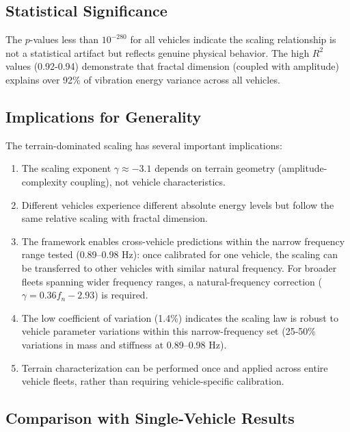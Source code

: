 \documentclass[11pt]{article}
\begin{document}
\subsection{Statistical Significance}

The $p$-values less than $10^{-280}$ for all vehicles indicate the scaling relationship is not a statistical artifact but reflects genuine physical behavior. The high $R^2$ values (0.92-0.94) demonstrate that fractal dimension (coupled with amplitude) explains over 92\% of vibration energy variance across all vehicles.

\subsection{Implications for Generality}

The terrain-dominated scaling has several important implications:

\begin{enumerate}
\item The scaling exponent $\gamma \approx -3.1$ depends on terrain geometry (amplitude-complexity coupling), not vehicle characteristics.

\item Different vehicles experience different absolute energy levels but follow the same relative scaling with fractal dimension.

\item The framework enables cross-vehicle predictions within the narrow frequency range tested (0.89--0.98 Hz): once calibrated for one vehicle, the scaling can be transferred to other vehicles with similar natural frequency. For broader fleets spanning wider frequency ranges, a natural-frequency correction ($\gamma = 0.36f_n - 2.93$) is required.

\item The low coefficient of variation (1.4\%) indicates the scaling law is robust to vehicle parameter variations within this narrow-frequency set (25-50\% variations in mass and stiffness at 0.89--0.98 Hz).

\item Terrain characterization can be performed once and applied across entire vehicle fleets, rather than requiring vehicle-specific calibration.
\end{enumerate}

\subsection{Comparison with Single-Vehicle Results}
\end{document}
